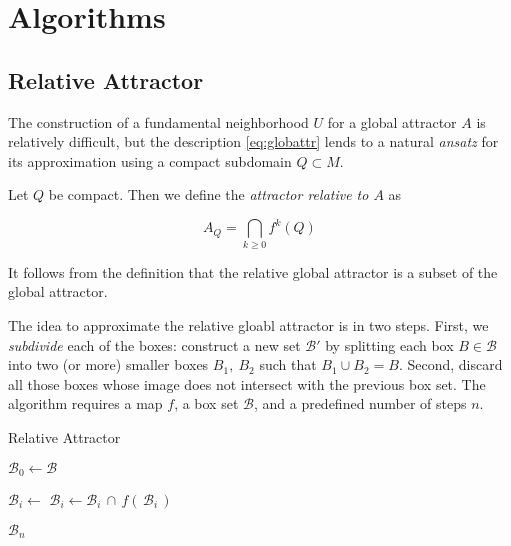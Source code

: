 \section{Algorithms}


\subsection{Relative Attractor}

The construction of a fundamental neighborhood $U$ for a global attractor $A$ is
relatively difficult, but the description \autoref{eq:globattr} lends to 
a natural \emph{ansatz} for its approximation using a compact subdomain $Q \subset M$. \\

\begin{definition}
    Let $Q$ be compact. Then we define the \emph{attractor relative to $A$} as

    \begin{equation}
        A_Q = \bigcap\limits_{k \geq 0} f^k (Q)
    \end{equation}

\end{definition}

\begin{remark}
    It follows from the definition that the relative global attractor is a subset of the 
    global attractor.\\
\end{remark}

The idea to approximate the relative gloabl attractor is in two steps. First, we \emph{subdivide} 
each of the boxes: construct a new set $\mathcal{B}'$ by splitting each box $B \in \mathcal{B}$ 
into two (or more) smaller boxes $B_1,\ B_2$ such that $B_1 \cup B_2 = B$. 
Second, discard all those boxes whose image does not intersect with the 
previous box set. The algorithm requires a map $f$, a box set $\mathcal{B}$, and a 
predefined number of steps $n$. 

\begin{algorithm}
    \caption{Relative Attractor}
    \label{alg:relativeattractor}

    \begin{algorithmic}[1]
        \State $\mathcal{B}_0 \gets \mathcal{B}$

            \State $\mathcal{B}_i \gets$ 
            \State $\mathcal{B}_i \gets \mathcal{B}_i\, \cap\, f (\,\mathcal{B}_i\,)$
        \EndFor

        \State \Return $\mathcal{B}_n$ 
    \end{algorithmic}
\end{algorithm}

